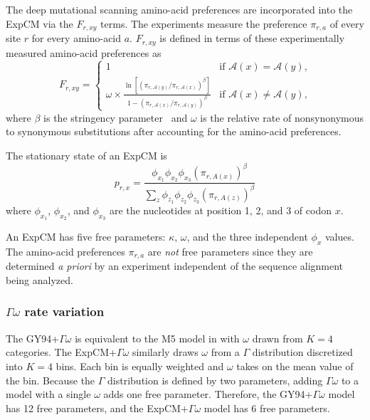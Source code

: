 \documentclass[11pt]{article}
\begin{document}
The deep mutational scanning amino-acid preferences are incorporated into the ExpCM via the $F_{r,xy}$ terms.
The experiments measure the preference $\pi_{r,a}$ of every site $r$ for every amino-acid $a$.
$F_{r,xy}$ is defined in terms of these experimentally measured amino-acid preferences as
\begin{equation}
\label{eq:Frxy}
F_{r,xy} = 
\begin{cases}
   1 & \mbox{if $\mathcal{A}\left(x\right) = \mathcal{A}\left(y\right)$,} \\
   \omega \times \frac{\ln\left[\left(\pi_{r,\mathcal{A}\left(y\right)} / \pi_{r,\mathcal{A}\left(x\right)}\right)^{\beta}\right]}{1 - \left(\pi_{r,\mathcal{A}\left(x\right)} / \pi_{r,\mathcal{A}\left(y\right)}\right)^{\beta}} & \mbox{if $\mathcal{A}\left(x\right) \ne \mathcal{A}\left(y\right)$,}
   \end{cases}
\end{equation}
where $\beta$ is the stringency parameter~\citep{bloom2014informed,hilton2017phydms} and $\omega$ is the relative rate of nonsynonymous to synonymous substitutions after accounting for the amino-acid preferences.

The stationary state of an ExpCM is 
\begin{equation}
\label{eq:prx}
p_{r,x} = \frac{\phi_{x_1}\phi_{x_2}\phi_{x_3}\left(\pi_{r,A\left(x\right)}\right)^\beta}{\sum_z \phi_{z_1}\phi_{z_2}\phi_{z_3}\left(\pi_{r,A\left(z\right)}\right)^\beta}
\end{equation}
where $\phi_{x_1}$, $\phi_{x_2}$, and $\phi_{x_3}$ are the nucleotides at position 1, 2, and 3 of codon $x$. 

An ExpCM has five free parameters: $\kappa$, $\omega$, and the three independent $\phi_x$ values.
The amino-acid preferences $\pi_{r,a}$ are \emph{not} free parameters since they are determined \textit{a priori} by an experiment independent of the sequence alignment being analyzed.

\subsubsection*{$\Gamma\omega$ rate variation}

The GY94+$\Gamma\omega$ is equivalent to the M5 model in \citet{yang2000codon} with $\omega$ drawn from $K = 4$ categories.
The ExpCM+$\Gamma\omega$ similarly draws $\omega$ from a $\Gamma$ distribution discretized into $K=4$ bins. 
Each bin is equally weighted and $\omega$ takes on the mean value of the bin. 
Because the $\Gamma$ distribution is defined by two parameters, adding $\Gamma\omega$ to a model with a single $\omega$ adds one free parameter.
Therefore, the GY94+$\Gamma\omega$ model has 12 free parameters, and the ExpCM+$\Gamma\omega$ model has 6 free parameters.
\end{document}
